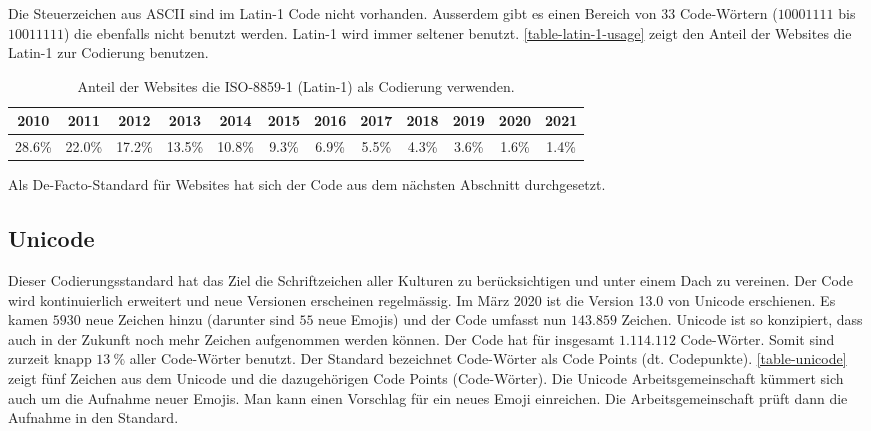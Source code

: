 Die Steuerzeichen aus \ac{ASCII} sind im Latin-1 Code nicht vorhanden. Ausserdem gibt es einen Bereich von $33$ Code-Wörtern ($10001111$ bis $10011111$) die ebenfalls nicht benutzt werden. Latin-1 wird immer seltener benutzt. \autoref{table-latin-1-usage} zeigt den Anteil der Websites die Latin-1 zur Codierung benutzen.

\begin{table}[htb]
\centering
\small
\begin{tabular}{|c|c|c|c|c|c|c|c|c|c|c|c|}
\hline
2010   & 2011   & 2012   & 2013   & 2014   & 2015  & 2016  & 2017  & 2018  & 2019  & 2020  & 2021 \\ \hline
28.6\% & 22.0\% & 17.2\% & 13.5\% & 10.8\% & 9.3\% & 6.9\% & 5.5\% & 4.3\% & 3.6\% & 1.6\% & 1.4\%       \\ \hline
\end{tabular}
\normalsize
\caption{Anteil der Websites die ISO-8859-1 (Latin-1) als Codierung verwenden.}
\label{table-latin-1-usage}
\end{table}

Als De-Facto-Standard für Websites hat sich der Code aus dem nächsten Abschnitt durchgesetzt.

\subsection{Unicode}

Dieser Codierungsstandard hat das Ziel die Schriftzeichen aller Kulturen zu berücksichtigen und unter einem Dach zu vereinen. Der Code wird kontinuierlich erweitert und neue Versionen erscheinen regelmässig. Im März 2020 ist die Version 13.0 von Unicode erschienen. Es kamen $5930$ neue Zeichen hinzu (darunter sind $55$ neue Emojis) und der Code umfasst nun $143.859$ Zeichen. Unicode ist so konzipiert, dass auch in der Zukunft noch mehr Zeichen aufgenommen werden können. Der Code hat  für insgesamt $1.114.112$ Code-Wörter. Somit sind zurzeit knapp $13~\%$ aller Code-Wörter benutzt. Der Standard bezeichnet Code-Wörter als Code Points (dt. Codepunkte). \autoref{table-unicode} zeigt fünf Zeichen aus dem Unicode und die dazugehörigen Code Points (Code-Wörter). Die Unicode Arbeitsgemeinschaft kümmert sich auch um die Aufnahme neuer Emojis. Man kann einen Vorschlag für ein neues Emoji einreichen. Die Arbeitsgemeinschaft prüft dann die Aufnahme in den Standard.

